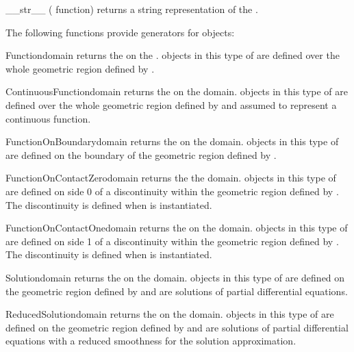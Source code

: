 \begin{methoddesc}[Domain]{__str__}{}
    (\PYTHON {} function) returns a string representation of the
    \FunctionSpace.
\end{methoddesc}
%
The following functions provide generators for \FunctionSpace objects:
%
\begin{funcdesc}{Function}{domain}
    returns the \Function on the \Domain {}. \Data objects in this
    type of \Function are defined over the whole geometric region defined by
    .
\end{funcdesc}
%
\begin{funcdesc}{ContinuousFunction}{domain}
    returns the \ContinuousFunction on the \Domain domain. \Data objects in
    this type of \Function are defined over the whole geometric region defined
    by  and assumed to represent a continuous function.
\end{funcdesc}
%
\begin{funcdesc}{FunctionOnBoundary}{domain}
    returns the \FunctionOnBoundary on the \Domain domain. \Data objects in
    this type of \Function are defined on the boundary of the geometric region
    defined by .
\end{funcdesc}
%
\begin{funcdesc}{FunctionOnContactZero}{domain}
    returns the \FunctionOnContactZero the \Domain domain. \Data objects in
    this type of \Function are defined on side 0 of a discontinuity  within
    the geometric region defined by .
    The discontinuity is defined when  is instantiated.
\end{funcdesc}
%
\begin{funcdesc}{FunctionOnContactOne}{domain}
    returns the \FunctionOnContactOne on the \Domain domain. \Data objects in
    this type of \Function are defined on side 1 of a discontinuity within
    the geometric region defined by .
    The discontinuity is defined when  is instantiated.
\end{funcdesc}
%
\begin{funcdesc}{Solution}{domain}
    returns the \SolutionFS on the \Domain domain. \Data objects in this type
    of \Function are defined on the geometric region defined by 
    and are solutions of partial differential equations.
\end{funcdesc}
%
\begin{funcdesc}{ReducedSolution}{domain}
    returns the \ReducedSolutionFS on the \Domain domain. \Data objects in
    this type of \Function are defined on the geometric region defined by
     and are solutions of partial differential
    equations with a reduced smoothness
    for the solution approximation.
\end{funcdesc}

